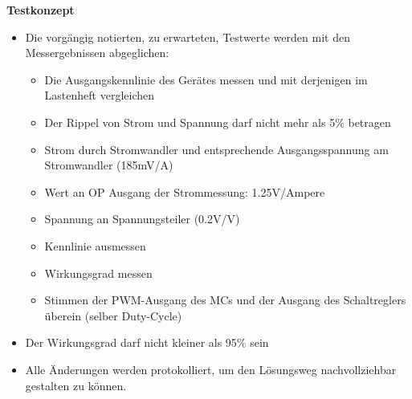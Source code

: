 \documentclass{fhnwreport}
\begin{document}
\textbf{Testkonzept}
\begin{itemize}
	\item Die vorgängig notierten, zu erwarteten, Testwerte werden mit den Messergebnissen abgeglichen:
		\begin{itemize}
		\item Die Ausgangskennlinie des Gerätes messen und mit derjenigen im Lastenheft vergleichen
		\item Der Rippel von Strom und Spannung darf nicht mehr als 5\% betragen
		\item Strom durch Stromwandler und entsprechende Ausgangsspannung am Stromwandler (185mV/A)
		\item Wert an OP Ausgang der Strommessung: 1.25V/Ampere
		\item Spannung an Spannungsteiler (0.2V/V) 
		\item Kennlinie ausmessen
		\item Wirkungsgrad messen
		\item Stimmen der PWM-Ausgang des MCs und der Ausgang des Schaltreglers überein	(selber Duty-Cycle)
		\end{itemize}
		\item Der Wirkungsgrad darf nicht kleiner als 95\% sein
	\item Alle Änderungen werden protokolliert, um den Lösungsweg nachvollziehbar gestalten zu können.
\end{itemize}

%
\end{document}
